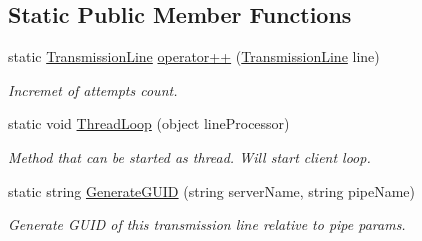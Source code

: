 \subsection*{Static Public Member Functions}
\begin{DoxyCompactItemize}
\item 
static \mbox{\hyperlink{class_pipes_provider_1_1_client_1_1_transmission_line}{Transmission\+Line}} \mbox{\hyperlink{class_pipes_provider_1_1_client_1_1_transmission_line_ada994593c98fe9aa24abb0a3ab55e6e2}{operator++}} (\mbox{\hyperlink{class_pipes_provider_1_1_client_1_1_transmission_line}{Transmission\+Line}} line)
\begin{DoxyCompactList}\small\item\em Incremet of attempts count. \end{DoxyCompactList}\item 
static void \mbox{\hyperlink{class_pipes_provider_1_1_client_1_1_transmission_line_aebf1f90d880307f803bdeb6e0020a95f}{Thread\+Loop}} (object line\+Processor)
\begin{DoxyCompactList}\small\item\em Method that can be started as thread. Will start client loop. \end{DoxyCompactList}\item 
static string \mbox{\hyperlink{class_pipes_provider_1_1_client_1_1_transmission_line_a334cde78dd1b3cc6c3cb2a6bb7419a1d}{Generate\+G\+U\+ID}} (string server\+Name, string pipe\+Name)
\begin{DoxyCompactList}\small\item\em Generate G\+U\+ID of this transmission line relative to pipe params. \end{DoxyCompactList}\end{DoxyCompactItemize}
